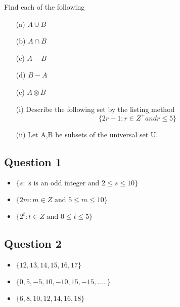 {{{\noindent Find each of the following
\begin{itemize}
\item[(a)] $A \cup B $
\item[(b)] $A \cap B $
\item[(c)] $A-B$
\item[(d)] $B-A$
\item[(e)] $A \otimes B$
\end{itemize}
\newpage



\begin{itemize}
	\item[(i)] Describe the following set by the listing method
	\[ \{ 2r+1 : r \in Z^{+} and r \leq 5  \} \]
	\item[(ii)] Let A,B be subsets of the universal set U.
	
	
\end{itemize}

\subsection*{Question 1}

\begin{itemize}
	\item $\{ s :  \mbox{ s is an odd integer and } 2 \leq s \leq 10 \}$
	\item $\{ 2m :  m \in Z \mbox{ and }5 \leq m \leq 10 \}$
	\item $\{ 2^t :  t \in Z \mbox{ and } 0 \leq t \leq 5 \}$
\end{itemize}

\subsection*{Question 2}

\begin{itemize}
	\item $\{12,13,14,15,16,17\}$
	\item $\{0,5,-5,10,-10,15,-15,.....\}$
	\item $\{6,8,10,12,14,16,18\}$
\end{itemize}

}}}
